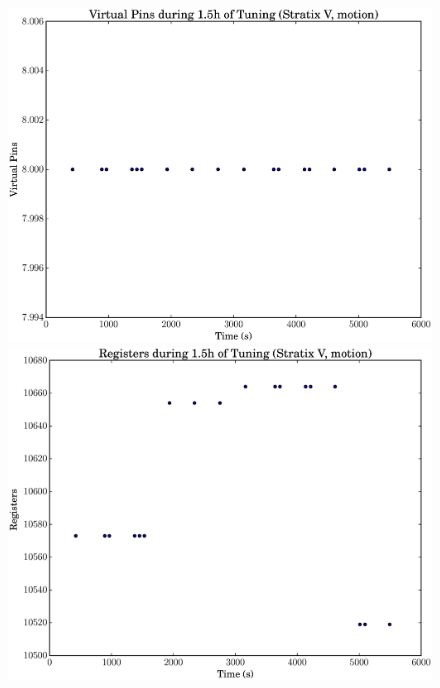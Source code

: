 \documentclass[12pt, a4paper]{article}
\begin{document}
\begin{figure}[htpb]
    \begin{minipage}{.48\textwidth}
        \includegraphics[scale=.25]{motion_pins_5400_chstone_StratixV}
    \end{minipage}%
    \hfill
    \begin{minipage}{.48\textwidth}
        \includegraphics[scale=.25]{motion_regs_5400_chstone_StratixV}
    \end{minipage}%


\end{figure}
\end{document}
